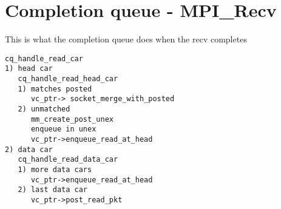 \documentclass[dvipdfm,twoside,11pt]{article}
\begin{document}
\section{Completion queue - MPI\_Recv}
This is what the completion queue does when the recv completes
\begin{verbatim}
cq_handle_read_car
1) head car
   cq_handle_read_head_car
   1) matches posted
      vc_ptr-> socket_merge_with_posted
   2) unmatched
      mm_create_post_unex
      enqueue in unex
      vc_ptr->enqueue_read_at_head
2) data car
   cq_handle_read_data_car
   1) more data cars
      vc_ptr->enqueue_read_at_head
   2) last data car
      vc_ptr->post_read_pkt
\end{verbatim}
\end{document}
